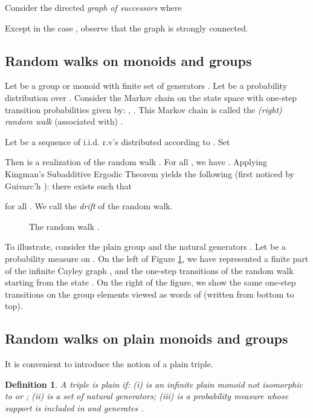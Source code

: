 \documentclass[11pt,a4paper]{article}
\newtheorem{definition}[theorem]{Definition}
\theoremstyle{remark}
\begin{document}
\medskip

Consider the directed {\em graph of successors}  where 

Except in the case , observe that the graph  is strongly
connected. 





\subsection{Random walks on monoids and groups}

Let  be a group or monoid with finite set of generators
. Let  be a probability distribution over .
Consider the Markov chain on the state space  with one-step
transition probabilities given by: , . This Markov chain is called the
\textit{(right) random walk} (associated with) .

Let  be a sequence of i.i.d. r.v's distributed
according to . Set


Then  is a realization of the random walk . For
all , we have . Applying Kingman's Subadditive Ergodic
Theorem yields the following (first noticed by Guivarc'h
\cite{guiv80}): there exists  such that

for all . We call  the {\em drift} of the
random walk.

\begin{figure}[ht]

\caption{The random walk .}
\label{fi-z2z3} 
\end{figure}



To illustrate, consider the plain group  and the natural generators
. Let  be a probability measure on
. 
On the left of Figure \ref{fi-z2z3}, we
have represented a finite part of the infinite Cayley graph ,
and the one-step transitions of the random walk  starting
from the state . On the right of the figure, 
we show the same one-step transitions on the group elements viewed as
words of  (written from bottom to top). 


\subsection{Random walks on plain monoids and groups}

It is convenient to introduce the notion of a plain triple.

\begin{definition}\label{de-0aut3}
A triple  is {\em plain} if: (i)  is an
infinite plain monoid not isomorphic to  or ; (ii)  is a set of natural generators; (iii) 
is a probability measure whose support is included in  and
generates .
\end{definition}
\end{document}
